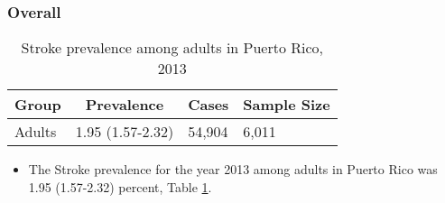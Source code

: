 
\subsubsection{Overall}




\begin{table}[H]
\caption{Stroke prevalence among adults in Puerto Rico, 2013\label{tab:Overall.tabl.Stroke.2013}} 
\begin{center}
\begin{tabular}{llll}
\hline\hline
\multicolumn{1}{l}{Group}&\multicolumn{1}{c}{Prevalence}&\multicolumn{1}{c}{Cases}&\multicolumn{1}{c}{Sample Size}\tabularnewline
\hline
Adults&1.95 (1.57-2.32)&54,904&6,011\tabularnewline
\hline
\end{tabular}\end{center}

\end{table}




\begin{itemize}


\item The Stroke prevalence for the year 2013 among adults in Puerto Rico was 1.95 (1.57-2.32) percent, 
Table \ref{tab:Overall.tabl.Stroke.2013}.

\end{itemize}



